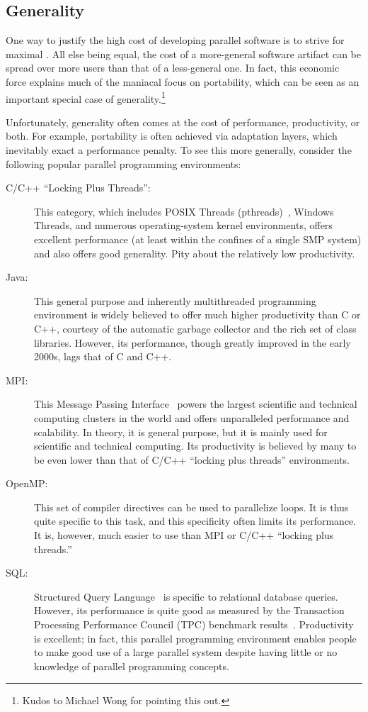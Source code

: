 \subsection{Generality}
\label{sec:intro:Generality}

One way to justify the high cost of developing parallel software
is to strive for maximal .
All else being equal, the cost of a more-general software artifact
can be spread over more users than that of a less-general one.
In fact, this economic force explains much of the maniacal focus
on portability, which can be seen as an important special case
of generality.\footnote{
	Kudos to Michael Wong for pointing this out.}

Unfortunately, generality often comes at the cost of performance,
productivity, or both.
For example, portability is often achieved via adaptation layers,
which inevitably exact a performance penalty.
To see this more generally, consider the following popular parallel
programming environments:

\begin{description}
\item[C/C++ ``Locking Plus Threads'':] This category, which includes
	POSIX Threads (pthreads)~\cite{OpenGroup1997pthreads},
	Windows Threads, and numerous
	operating-system kernel environments, offers excellent performance
	(at least within the confines of a single SMP system)
	and also offers good generality.
	Pity about the relatively low productivity.
\item[Java:] This general purpose and inherently multithreaded
	programming environment	is widely believed to offer much higher
	productivity than C or C++, courtesy of the automatic garbage collector
	and the rich set of class libraries.
	However, its performance, though greatly improved in the early
	2000s, lags that of C and C++.
\item[MPI:] This Message Passing Interface~\cite{MPIForum2008} powers
	the largest scientific and technical computing clusters in
	the world and offers unparalleled performance and scalability.
	In theory, it is general purpose, but it is mainly used
	for scientific and technical computing.
	Its productivity is believed by many to be even lower than that
	of C/C++ ``locking plus threads'' environments.
\item[OpenMP:] This set of compiler directives can be used
	to parallelize loops.
	It is thus quite specific to this
	task, and this specificity often limits its performance.
	It is, however, much easier to use than MPI or C/C++
	``locking plus threads.''
\item[SQL:] Structured Query Language~\cite{DIS9075SQL92} is
	specific to relational database queries.
	However, its performance is quite good as measured by the
	Transaction Processing Performance Council (TPC)
	benchmark results~\cite{TPC}.
	Productivity is excellent; in fact, this parallel programming
	environment enables people to make good use of a large parallel
	system despite having little or no knowledge of parallel
	programming concepts.
\end{description}

